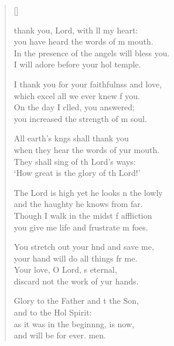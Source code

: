 \settowidth{\versewidth}{In the presence of the angels I will bless you. *}
\begin{verse}[\versewidth]
  \begin{patverse}
 thank you, Lord, with ll my heart:\Med\\
you have heard the words of m mouth.\\
In the presence of the angels  will bless you.\Med\\
I will adore before your hol temple.

I thank you for your faithfulnss and love,\Med\\
which excel all we ever knew f you.\\
On the day I clled, you answered;\Med\\
you increased the strength of m soul.

All earth’s k\pointup{\i}ngs shall thank you\Med\\
when they hear the words of yur mouth.\\
They shall sing of th Lord’s ways:\Med\\
‘How great is the glory of th Lord!’

The Lord is high yet he looks n the lowly\Med\\
and the haughty he knows from far.\\
Though I walk in the midst f affliction\Med\\
you give me life and frustrate m foes.

You stretch out your hnd and save me,\Med\\
your hand will do all things fr me.\\
Your love, O Lord, \pointup{\i}s eternal,\Med\\
discard not the work of yur hands.

Glory to the Father and t the Son,\Med\\
and to the Hol Spirit:\\
as it was in the beginn\pointup{\i}ng, is now,\Med\\
and will be for ever. men.
  \end{patverse}
\end{verse}
